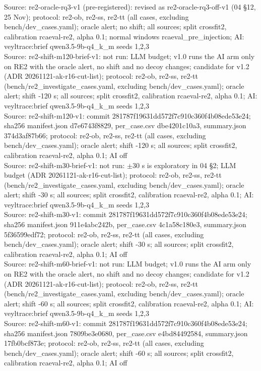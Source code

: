\begin{table}[t]
Source: re2-oracle-rq3-v1 (pre-registered): revised as re2-oracle-rq3-off-v1 (04 \S{}12, 25 Nov); protocol: re2-ob, re2-ss, re2-tt (all cases, excluding bench/dev\_cases.yaml); oracle alert; no shift; all sources; split crossfit2, calibration rcaeval-re2, alpha 0.1; normal windows rcaeval\_pre\_injection; AI: veyltrace:brief qwen3.5-9b-q4\_k\_m seeds 1,2,3\\
Source: re2-shift-m120-brief-v1: not run: LLM budget; v1.0 runs the AI arm only on RE2 with the oracle alert, no shift and no decoy changes; candidate for v1.2 (ADR 20261121-ak-r16-cut-list); protocol: re2-ob, re2-ss, re2-tt (bench/re2\_investigate\_cases.yaml, excluding bench/dev\_cases.yaml); oracle alert; shift -120 s; all sources; split crossfit2, calibration rcaeval-re2, alpha 0.1; AI: veyltrace:brief qwen3.5-9b-q4\_k\_m seeds 1,2,3\\
Source: re2-shift-m120-v1: commit 281787f19631dd572f7c910c360f4b08ede53e24; sha256 manifest.json d7e6743f8829, per\_case.csv dbe4201c10a3, summary.json 374d3af87b66; protocol: re2-ob, re2-ss, re2-tt (all cases, excluding bench/dev\_cases.yaml); oracle alert; shift -120 s; all sources; split crossfit2, calibration rcaeval-re2, alpha 0.1; AI off\\
Source: re2-shift-m30-brief-v1: not run: $\pm$30 s is exploratory in 04 \S{}2; LLM budget (ADR 20261121-ak-r16-cut-list); protocol: re2-ob, re2-ss, re2-tt (bench/re2\_investigate\_cases.yaml, excluding bench/dev\_cases.yaml); oracle alert; shift -30 s; all sources; split crossfit2, calibration rcaeval-re2, alpha 0.1; AI: veyltrace:brief qwen3.5-9b-q4\_k\_m seeds 1,2,3\\
Source: re2-shift-m30-v1: commit 281787f19631dd572f7c910c360f4b08ede53e24; sha256 manifest.json 911e4abc242b, per\_case.csv 4c1a58c180e3, summary.json 5f36599edf72; protocol: re2-ob, re2-ss, re2-tt (all cases, excluding bench/dev\_cases.yaml); oracle alert; shift -30 s; all sources; split crossfit2, calibration rcaeval-re2, alpha 0.1; AI off\\
Source: re2-shift-m60-brief-v1: not run: LLM budget; v1.0 runs the AI arm only on RE2 with the oracle alert, no shift and no decoy changes; candidate for v1.2 (ADR 20261121-ak-r16-cut-list); protocol: re2-ob, re2-ss, re2-tt (bench/re2\_investigate\_cases.yaml, excluding bench/dev\_cases.yaml); oracle alert; shift -60 s; all sources; split crossfit2, calibration rcaeval-re2, alpha 0.1; AI: veyltrace:brief qwen3.5-9b-q4\_k\_m seeds 1,2,3\\
Source: re2-shift-m60-v1: commit 281787f19631dd572f7c910c360f4b08ede53e24; sha256 manifest.json 7809be3e0680, per\_case.csv e4bd84492584, summary.json 17fb0bcf873e; protocol: re2-ob, re2-ss, re2-tt (all cases, excluding bench/dev\_cases.yaml); oracle alert; shift -60 s; all sources; split crossfit2, calibration rcaeval-re2, alpha 0.1; AI off\\

\end{table}
